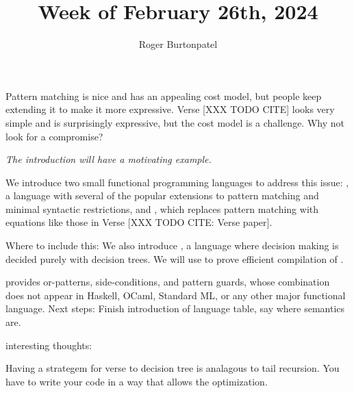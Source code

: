 \documentclass{article}
\title{Week of February 26th, 2024}
\author{Roger Burtonpatel}
\begin{document}
\maketitle

Pattern matching is nice and has an appealing cost model, but people keep
extending it to make it more expressive. Verse [XXX TODO CITE] looks very simple
and is surprisingly expressive, but the cost model is a challenge. Why not look
for a compromise?

\bigskip 
\it{The introduction will have a motivating example.}
\bigskip 



We introduce two small functional programming languages to address this issue:
{\PPlus}, a language with several of the popular extensions to pattern matching
and minimal syntactic restrictions, and {\VMinus}, which replaces pattern matching
with equations like those in Verse [XXX TODO CITE: Verse paper]. 

Where to include this: 
We also introduce {\D}, a language where decision making is decided purely with decision
trees. We will use {\D} to prove efficient compilation of {\VMinus}. 

{\PPlus} provides or-patterns, side-conditions, and pattern guards, whose
combination does not appear in Haskell, OCaml, Standard ML, or any other major
functional language. 
\bigskip
Next steps: Finish introduction of language table, say where semantics are. 

\bigskip
interesting thoughts: 

Having a strategem for verse to decision tree is analagous to tail recursion. 
You have to write your code in a way that allows the optimization. 




\end{document}
